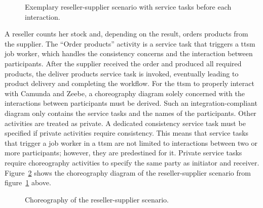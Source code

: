 \begin{figure}[h]
    \caption{Exemplary reseller-supplier scenario with service tasks before each interaction.}
    \label{fig:evaluation:integration:service_tasks}
\end{figure}

A reseller counts her stock and, depending on the result, orders products from the supplier. The ``Order products'' activity is a service task that triggers a \gls{ttsm} job worker, which handles the consistency concerns and the interaction between participants. After the supplier received the order and produced all required products, the deliver products service task is invoked, eventually leading to product delivery and completing the workflow. For the \gls{ttsm} to properly interact with Camunda and Zeebe, a choreography diagram solely concerned with the interactions between participants must be derived. Such an integration-compliant diagram only contains the service tasks and the names of the participants. Other activities are treated as private. A dedicated consistency service task must be specified if private activities require consistency. This means that service tasks that trigger a job worker in a \gls{ttsm} are not limited to interactions between two or more participants; however, they are predestined for it. Private service tasks require choreography activities to specify the same party as initiator and receiver. Figure~\ref{fig:evaluation:integration:service_tasks_choreography} shows the choreography diagram of the reseller-supplier scenario from figure~\ref{fig:evaluation:integration:service_tasks} above.

\begin{figure}[h]
    \caption{Choreography of the reseller-supplier scenario.}
    \label{fig:evaluation:integration:service_tasks_choreography}
\end{figure}

